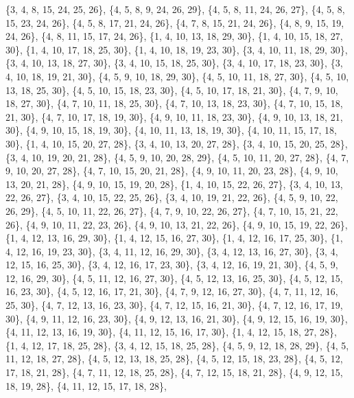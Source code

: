 \documentclass[11pt,a4paper]{article}
\begin{document}
{\{3, 4, 8, 15, 24, 25, 26\}, \{4, 5, 8, 9, 24, 26, 29\}, \{4, 5, 8, 11, 24, 26, 27\}, \{4, 5, 8, 15, 23, 24, 26\}, \{4, 5, 8, 17, 21, 24, 26\},
\{4, 7, 8, 15, 21, 24, 26\}, \{4, 8, 9, 15, 19, 24, 26\}, \{4, 8, 11, 15, 17, 24, 26\}, \{1, 4, 10, 13, 18, 29, 30\}, \{1, 4, 10, 15, 18, 27, 30\},
\{1, 4, 10, 17, 18, 25, 30\}, \{1, 4, 10, 18, 19, 23, 30\}, \{3, 4, 10, 11, 18, 29, 30\}, \{3, 4, 10, 13, 18, 27, 30\}, \{3, 4, 10, 15, 18, 25, 30\},
\{3, 4, 10, 17, 18, 23, 30\}, \{3, 4, 10, 18, 19, 21, 30\}, \{4, 5, 9, 10, 18, 29, 30\}, \{4, 5, 10, 11, 18, 27, 30\}, \{4, 5, 10, 13, 18, 25, 30\},
\{4, 5, 10, 15, 18, 23, 30\}, \{4, 5, 10, 17, 18, 21, 30\}, \{4, 7, 9, 10, 18, 27, 30\}, \{4, 7, 10, 11, 18, 25, 30\}, \{4, 7, 10, 13, 18, 23, 30\},
\{4, 7, 10, 15, 18, 21, 30\}, \{4, 7, 10, 17, 18, 19, 30\}, \{4, 9, 10, 11, 18, 23, 30\}, \{4, 9, 10, 13, 18, 21, 30\}, \{4, 9, 10, 15, 18, 19, 30\},
\{4, 10, 11, 13, 18, 19, 30\}, \{4, 10, 11, 15, 17, 18, 30\}, \{1, 4, 10, 15, 20, 27, 28\}, \{3, 4, 10, 13, 20, 27, 28\}, \{3, 4, 10, 15, 20, 25, 28\},
\{3, 4, 10, 19, 20, 21, 28\}, \{4, 5, 9, 10, 20, 28, 29\}, \{4, 5, 10, 11, 20, 27, 28\}, \{4, 7, 9, 10, 20, 27, 28\}, \{4, 7, 10, 15, 20, 21, 28\},
\{4, 9, 10, 11, 20, 23, 28\}, \{4, 9, 10, 13, 20, 21, 28\}, \{4, 9, 10, 15, 19, 20, 28\}, \{1, 4, 10, 15, 22, 26, 27\}, \{3, 4, 10, 13, 22, 26, 27\},
\{3, 4, 10, 15, 22, 25, 26\}, \{3, 4, 10, 19, 21, 22, 26\}, \{4, 5, 9, 10, 22, 26, 29\}, \{4, 5, 10, 11, 22, 26, 27\}, \{4, 7, 9, 10, 22, 26, 27\},
\{4, 7, 10, 15, 21, 22, 26\}, \{4, 9, 10, 11, 22, 23, 26\}, \{4, 9, 10, 13, 21, 22, 26\}, \{4, 9, 10, 15, 19, 22, 26\}, \{1, 4, 12, 13, 16, 29, 30\},
\{1, 4, 12, 15, 16, 27, 30\}, \{1, 4, 12, 16, 17, 25, 30\}, \{1, 4, 12, 16, 19, 23, 30\}, \{3, 4, 11, 12, 16, 29, 30\}, \{3, 4, 12, 13, 16, 27, 30\},
\{3, 4, 12, 15, 16, 25, 30\}, \{3, 4, 12, 16, 17, 23, 30\}, \{3, 4, 12, 16, 19, 21, 30\}, \{4, 5, 9, 12, 16, 29, 30\}, \{4, 5, 11, 12, 16, 27, 30\},
\{4, 5, 12, 13, 16, 25, 30\}, \{4, 5, 12, 15, 16, 23, 30\}, \{4, 5, 12, 16, 17, 21, 30\}, \{4, 7, 9, 12, 16, 27, 30\}, \{4, 7, 11, 12, 16, 25, 30\},
\{4, 7, 12, 13, 16, 23, 30\}, \{4, 7, 12, 15, 16, 21, 30\}, \{4, 7, 12, 16, 17, 19, 30\}, \{4, 9, 11, 12, 16, 23, 30\}, \{4, 9, 12, 13, 16, 21, 30\},
\{4, 9, 12, 15, 16, 19, 30\}, \{4, 11, 12, 13, 16, 19, 30\}, \{4, 11, 12, 15, 16, 17, 30\}, \{1, 4, 12, 15, 18, 27, 28\}, \{1, 4, 12, 17, 18, 25, 28\},
\{3, 4, 12, 15, 18, 25, 28\}, \{4, 5, 9, 12, 18, 28, 29\}, \{4, 5, 11, 12, 18, 27, 28\}, \{4, 5, 12, 13, 18, 25, 28\}, \{4, 5, 12, 15, 18, 23, 28\},
\{4, 5, 12, 17, 18, 21, 28\}, \{4, 7, 11, 12, 18, 25, 28\}, \{4, 7, 12, 15, 18, 21, 28\}, \{4, 9, 12, 15, 18, 19, 28\}, \{4, 11, 12, 15, 17, 18, 28\},
}
\end{document}
